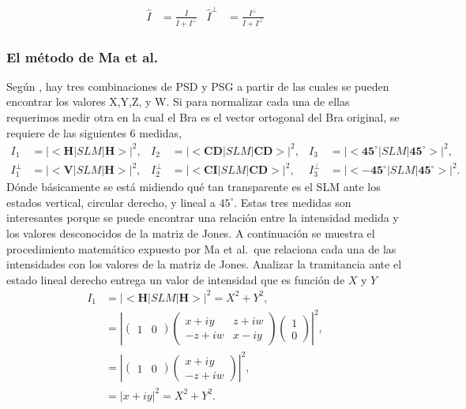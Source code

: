\begin{align*}
\hat{I} &= \frac{I}{I+I^{\perp}}&\hat{I}^{\perp} &= \frac{I^{\perp}}{I+I^{\perp}}
\end{align*}

\subsubsection{El método de Ma et al.}

Según , hay tres combinaciones de PSD y PSG a partir
de las cuales se pueden encontrar los valores X,Y,Z, y W. Si para
normalizar cada una de ellas requerimos medir otra en la cual el Bra
es el vector ortogonal del Bra original, se requiere de las siguientes
6 medidas, 
\begin{align*}
I_1 &= |<\mathbf{H}|SLM|\mathbf{H}>|^2,& I_2 &= |<\mathbf{CD}|SLM|\mathbf{CD}>|^2,&I_3
  &= |<\mathbf{45^{\circ}}|SLM|\mathbf{45^{\circ}}>|^2,\\
I_1^{\perp} &= |<\mathbf{V}|SLM|\mathbf{H}>|^2,&I_2^{\perp} &= |<\mathbf{CI}|SLM|\mathbf{CD}>|^2,&I_{3}^{\perp} &= |<\mathbf{-45^{\circ}}|SLM|\mathbf{45^{\circ}}>|^2.
\end{align*}
Dónde básicamente se está midiendo qué tan transparente es el SLM ante
los estados vertical, circular derecho, y lineal a $45^{\circ}$. 
Estas tres medidas son interesantes porque se puede encontrar una
relación entre la intensidad medida 
y los valores desconocidos de la matriz de Jones. 
A continuación se muestra el procedimiento matemático expuesto por Ma
et al.~que relaciona cada una de las intensidades con los valores de
la matriz de Jones. 
Analizar la tramitancia ante el estado lineal derecho entrega un valor
de intensidad que es función de $X$ y $Y$
\begin{align*}
I_1 &= |<\mathbf{H}|SLM|\mathbf{H}>|^2 = X^2+Y^2,\\
&=  \left|\begin{pmatrix} 1&0\end{pmatrix} 
       \begin{pmatrix}
         x+iy & z+iw \\-z+iw & x-iy
       \end{pmatrix} \begin{pmatrix}1\\0\end{pmatrix}\right|^2, \\
&=  \left|\begin{pmatrix} 1&0\end{pmatrix} 
       \begin{pmatrix} x+iy \\-z+iw \end{pmatrix} \right|^2, \\
&=  \left|x+iy\right|^2 =  X^2+Y^2.\\
\end{align*}
